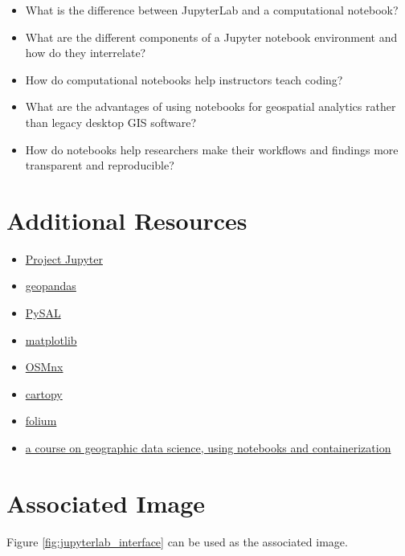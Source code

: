 \documentclass[11pt,letterpaper]{article}
\begin{document}
\begin{itemize}
    \item What is the difference between JupyterLab and a computational notebook?
    \item What are the different components of a Jupyter notebook environment and how do they interrelate?
    \item How do computational notebooks help instructors teach coding?
    \item What are the advantages of using notebooks for geospatial analytics rather than legacy desktop GIS software?
    \item How do notebooks help researchers make their workflows and findings more transparent and reproducible?
\end{itemize}

\section*{Additional Resources}

\begin{itemize}
    \item \href{https://jupyter.org/}{Project Jupyter}
    \item \href{https://geopandas.org/}{geopandas}
    \item \href{https://pysal.org/}{PySAL}
    \item \href{https://matplotlib.org/}{matplotlib}
    \item \href{https://osmnx.readthedocs.io/}{OSMnx}
    \item \href{https://scitools.org.uk/cartopy/docs/latest/}{cartopy}
    \item \href{https://python-visualization.github.io/folium/}{folium}
    \item \href{https://doi.org/10.5281/zenodo.1135210}{a course on geographic data science, using notebooks and containerization}
\end{itemize}

\section*{Associated Image}

Figure \ref{fig:jupyterlab_interface} can be used as the associated image.
\end{document}
